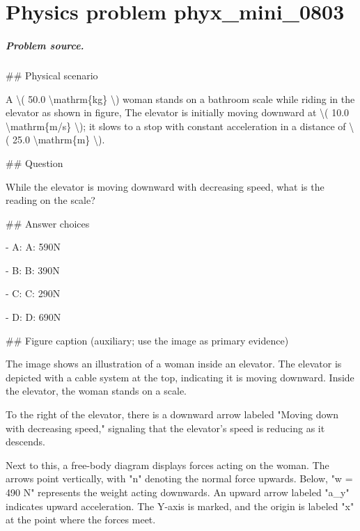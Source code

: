 
\chapter{Physics problem phyx\_mini\_0803}
\label{ch:PhyXMiniProblems_problem_phyx_mini_0803}

\paragraph{Problem source.}
\#\# Physical scenario

A \textbackslash{}( 50.0 \textbackslash{}mathrm\{kg\} \textbackslash{}) woman stands on a bathroom scale while riding in the elevator as shown in figure, The elevator is initially moving downward at \textbackslash{}( 10.0 \textbackslash{}mathrm\{m/s\} \textbackslash{}); it slows to a stop with constant acceleration in a distance of \textbackslash{}( 25.0 \textbackslash{}mathrm\{m\} \textbackslash{}).

\#\# Question

While the elevator is moving downward with decreasing speed, what is the reading on the scale?

\#\# Answer choices

- A: A: 590N

- B: B: 390N

- C: C: 290N

- D: D: 690N

\#\# Figure caption (auxiliary; use the image as primary evidence)

The image shows an illustration of a woman inside an elevator. The elevator is depicted with a cable system at the top, indicating it is moving downward. Inside the elevator, the woman stands on a scale.

To the right of the elevator, there is a downward arrow labeled "Moving down with decreasing speed," signaling that the elevator's speed is reducing as it descends.

Next to this, a free-body diagram displays forces acting on the woman. The arrows point vertically, with "n" denoting the normal force upwards. Below, "w = 490 N" represents the weight acting downwards. An upward arrow labeled "a\_y" indicates upward acceleration. The Y-axis is marked, and the origin is labeled "x" at the point where the forces meet.

